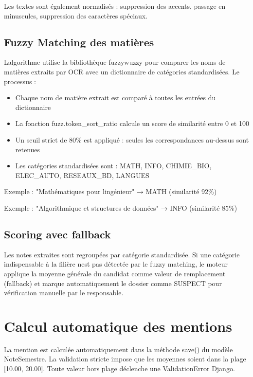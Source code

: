 Les textes sont également normalisés : suppression des accents, passage
en minuscules, suppression des caractères spéciaux.

\subsection{Fuzzy Matching des
matières}

L\textquotesingle algorithme utilise la bibliothèque fuzzywuzzy pour
comparer les noms de matières extraits par OCR avec un dictionnaire de
catégories standardisées. Le processus :

\begin{itemize}
\item
  Chaque nom de matière extrait est comparé à toutes les entrées du
  dictionnaire
\item
  La fonction fuzz.token\_sort\_ratio calcule un score de similarité
  entre 0 et 100
\item
  Un seuil strict de 80\% est appliqué : seules les correspondances
  au-dessus sont retenues
\item
  Les catégories standardisées sont : MATH, INFO, CHIMIE\_BIO,
  ELEC\_AUTO, RESEAUX\_BD, LANGUES
\end{itemize}

Exemple : "Mathématiques pour l\textquotesingle ingénieur" → MATH
(similarité 92\%)

Exemple : "Algorithmique et structures de données" → INFO (similarité
85\%)

\subsection{Scoring avec fallback}

Les notes extraites sont regroupées par catégorie standardisée. Si une
catégorie indispensable à la filière n\textquotesingle est pas détectée
par le fuzzy matching, le moteur applique la moyenne générale du
candidat comme valeur de remplacement (fallback) et marque
automatiquement le dossier comme SUSPECT pour vérification manuelle par
le responsable.

\section{Calcul automatique des
mentions}

La mention est calculée automatiquement dans la méthode save() du modèle
NoteSemestre. La validation stricte impose que les moyennes soient dans
la plage {[}10.00, 20.00{]}. Toute valeur hors plage déclenche une
ValidationError Django.

